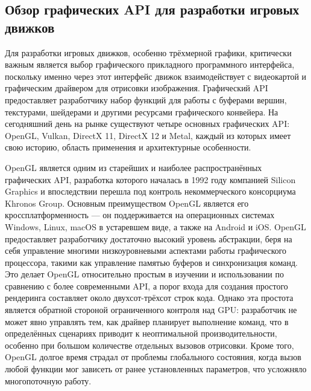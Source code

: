 \subsection{Обзор графических API для разработки игровых движков}
Для разработки игровых движков, особенно трёхмерной графики, критически важным является выбор графического прикладного программного интерфейса, поскольку именно через этот интерфейс движок взаимодействует с видеокартой и графическим драйвером для отрисовки изображения. Графический API предоставляет разработчику набор функций для работы с буферами вершин, текстурами, шейдерами и другими ресурсами графического конвейера. На сегодняшний день на рынке существуют четыре основных графических API: OpenGL, Vulkan, DirectX 11, DirectX 12 и Metal, каждый из которых имеет свою историю, область применения и архитектурные особенности.

OpenGL является одним из старейших и наиболее распространённых графических API, разработка которого началась в 1992 году компанией Silicon Graphics и впоследствии перешла под контроль некоммерческого консорциума Khronos Group. Основным преимуществом OpenGL является его кроссплатформенность — он поддерживается на операционных системах Windows, Linux, macOS в устаревшем виде, а также на Android и iOS. OpenGL предоставляет разработчику достаточно высокий уровень абстракции, беря на себя управление многими низкоуровневыми аспектами работы графического процессора, такими как управление памятью буферов и синхронизация команд. Это делает OpenGL относительно простым в изучении и использовании по сравнению с более современными API, а порог входа для создания простого рендеринга составляет около двухсот-трёхсот строк кода. Однако эта простота является обратной стороной ограниченного контроля над GPU: разработчик не может явно управлять тем, как драйвер планирует выполнение команд, что в определённых сценариях приводит к неоптимальной производительности, особенно при большом количестве отдельных вызовов отрисовки. Кроме того, OpenGL долгое время страдал от проблемы глобального состояния, когда вызов любой функции мог зависеть от ранее установленных параметров, что усложняло многопоточную работу.

